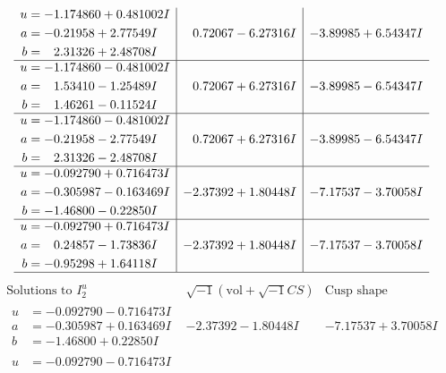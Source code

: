 \documentclass[1p]{elsarticle_modified}
\theoremstyle{definition}
\newcommand{\I}{\sqrt{-1}}
\begin{document}
$$\begin{array}{c|c|c}
\begin{aligned}
u &= -1.174860 + 0.481002 I \\
a &= -0.21958 + 2.77549 I \\
b &= \phantom{-}2.31326 + 2.48708 I\end{aligned}
 & \phantom{-}0.72067 - 6.27316 I & -3.89985 + 6.54347 I \\ \hline\begin{aligned}
u &= -1.174860 - 0.481002 I \\
a &= \phantom{-}1.53410 - 1.25489 I \\
b &= \phantom{-}1.46261 - 0.11524 I\end{aligned}
 & \phantom{-}0.72067 + 6.27316 I & -3.89985 - 6.54347 I \\ \hline\begin{aligned}
u &= -1.174860 - 0.481002 I \\
a &= -0.21958 - 2.77549 I \\
b &= \phantom{-}2.31326 - 2.48708 I\end{aligned}
 & \phantom{-}0.72067 + 6.27316 I & -3.89985 - 6.54347 I \\ \hline\begin{aligned}
u &= -0.092790 + 0.716473 I \\
a &= -0.305987 - 0.163469 I \\
b &= -1.46800 - 0.22850 I\end{aligned}
 & -2.37392 + 1.80448 I & -7.17537 - 3.70058 I \\ \hline\begin{aligned}
u &= -0.092790 + 0.716473 I \\
a &= \phantom{-}0.24857 - 1.73836 I \\
b &= -0.95298 + 1.64118 I\end{aligned}
 & -2.37392 + 1.80448 I & -7.17537 - 3.70058 I\\
 \hline 
 \end{array}$$\newpage$$\begin{array}{c|c|c}  
\text{Solutions to }I^u_{2}& \I (\text{vol} + \sqrt{-1}CS) & \text{Cusp shape}\\
 \hline 
\begin{aligned}
u &= -0.092790 - 0.716473 I \\
a &= -0.305987 + 0.163469 I \\
b &= -1.46800 + 0.22850 I\end{aligned}
 & -2.37392 - 1.80448 I & -7.17537 + 3.70058 I \\ \hline\begin{aligned}
u &= -0.092790 - 0.716473 I \\

\end{aligned}
\end{array}$$
\end{document}
